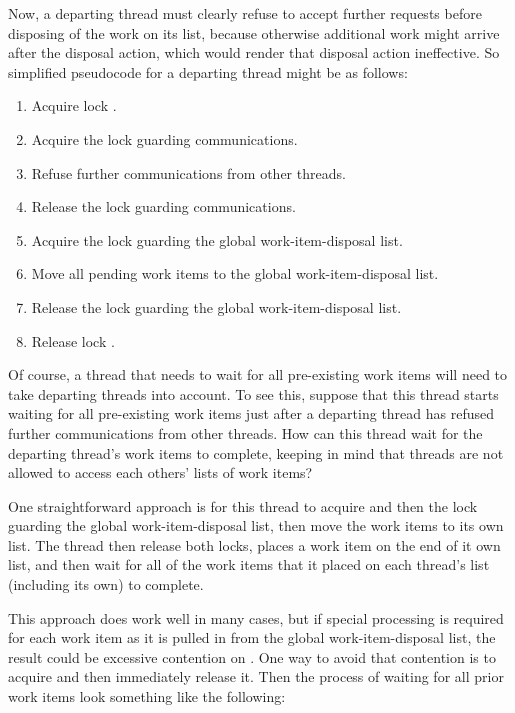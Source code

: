 {	Now, a departing thread must clearly refuse to accept further
	requests before disposing of the work on its list, because
	otherwise additional work might arrive after the disposal action,
	which would render that disposal action ineffective.
	So simplified pseudocode for a departing thread might be as follows:

	\begin{enumerate}
	\item	Acquire lock .
	\item	Acquire the lock guarding communications.
	\item	Refuse further communications from other threads.
	\item	Release the lock guarding communications.
	\item	Acquire the lock guarding the global work-item-disposal list.
	\item	Move all pending work items to the global
		work-item-disposal list.
	\item	Release the lock guarding the global work-item-disposal list.
	\item	Release lock .
	\end{enumerate}

	Of course, a thread that needs to wait for all pre-existing work
	items will need to take departing threads into account.
	To see this, suppose that this thread starts waiting for all
	pre-existing work items just after a departing thread has refused
	further communications from other threads.
	How can this thread wait for the departing thread's work items
	to complete, keeping in mind that threads are not allowed to
	access each others' lists of work items?

	One straightforward approach is for this thread to acquire 
	and then the lock guarding the global work-item-disposal list, then
	move the work items to its own list.
	The thread then release both locks,
	places a work item on the end of it own list,
	and then wait for all of the work items that it placed on each thread's
	list (including its own) to complete.

	This approach does work well in many cases, but if special
	processing is required for each work item as it is pulled in
	from the global work-item-disposal list, the result could be
	excessive contention on .
	One way to avoid that contention is to acquire  and then
	immediately release it.
	Then the process of waiting for all prior work items look
	something like the following:

}
